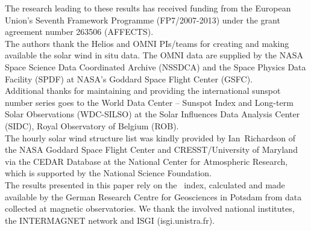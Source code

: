 \begin{acknowledgements}
	The research leading to these results has received funding from the European Union's Seventh Framework Programme (FP7/2007-2013) under the grant agreement number 263506 (AFFECTS).\\
	The authors thank the Helios and OMNI PIs/teams for creating and making available the solar wind in situ data. The OMNI data are supplied by the NASA Space Science Data Coordinated Archive (NSSDCA) and the Space Physics Data Facility (SPDF) at NASA's Goddard Space Flight Center (GSFC).\\
	Additional thanks for maintaining and providing the international sunspot number series goes to the World Data Center -- Sunspot Index and Long-term Solar Observations (WDC-SILSO) at the Solar Influences Data Analysis Center (SIDC), Royal Observatory of Belgium (ROB).\\
	The hourly solar wind structure list was kindly provided by Ian~Richardson of the NASA Goddard Space Flight Center and CRESST/University of Maryland via the CEDAR Database at the National Center for Atmospheric Research, which is supported by the National Science Foundation.\\
	The results presented in this paper rely on the \Kp{}~index, calculated and made available by the German Research Centre for Geosciences in Potsdam from data collected at magnetic observatories. We thank the involved national institutes, the INTERMAGNET network and ISGI (isgi.unistra.fr).\\
\end{acknowledgements}
